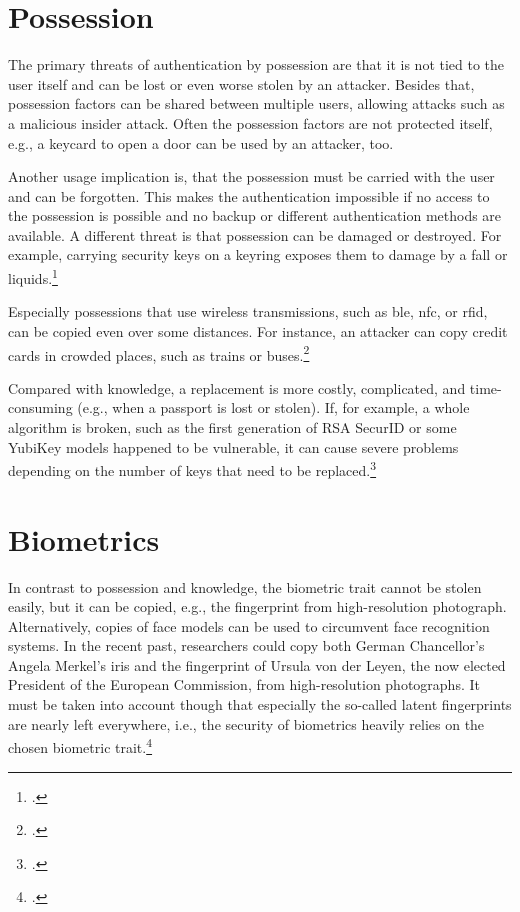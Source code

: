 \section{Possession}
\label{sec:possession-security}

The primary threats of authentication by possession are that it is not tied to the user itself and can be lost or even worse stolen by an attacker. Besides that, possession factors can be shared between multiple users, allowing attacks such as a malicious insider attack. Often the possession factors are not protected itself, e.g., a keycard to open a door can be used by an attacker, too.

Another usage implication is, that the possession must be carried with the user and can be forgotten. This makes the authentication impossible if no access to the possession is possible and no backup or different authentication methods are available. A different threat is that possession can be damaged or destroyed. For example, carrying security keys on a keyring exposes them to damage by a fall or liquids.\footcites[See][263--264]{shostack2014threat}

Especially possessions that use wireless transmissions, such as \gls{ble}, \gls{nfc}, or \gls{rfid}, can be copied even over some distances. For instance, an attacker can copy credit cards in crowded places, such as trains or buses.\footcite[See][2--3]{6892730}

Compared with knowledge, a replacement is more costly, complicated, and time-consuming (e.g., when a passport is lost or stolen). If, for example, a whole algorithm is broken, such as the first generation of RSA SecurID or some YubiKey models happened to be vulnerable, it can cause severe problems depending on the number of keys that need to be replaced.\footcites[See][18]{dasgupta2017multi}[See][364--265]{BIRYUKOV2005364}[See][]{yubikey-heise}

\section{Biometrics}

In contrast to possession and knowledge, the biometric trait cannot be stolen easily, but it can be copied, e.g., the fingerprint from high-resolution photograph. Alternatively, copies of face models can be used to circumvent face recognition systems. In the recent past, researchers could copy both German Chancellor's Angela Merkel's iris and the fingerprint of Ursula von der Leyen, the now elected President of the European Commission, from high-resolution photographs. It must be taken into account though that especially the so-called latent fingerprints are nearly left everywhere, i.e., the security of biometrics heavily relies on the chosen biometric trait.\footcites[See][7--8]{185181}[See][7--8]{220566}[See][p. e199]{MARTIN2013e189}[See][]{ccc-merkel}

